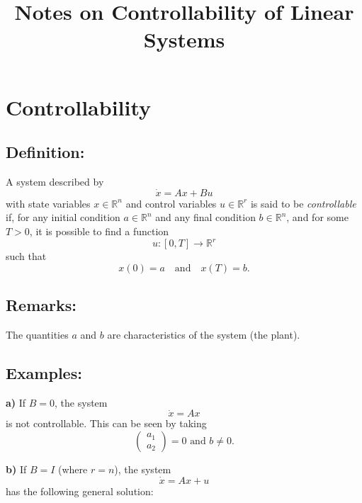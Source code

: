 \documentclass{article}
\title{Notes on Controllability of Linear Systems}
\author{}
\date{}
\begin{document}
\maketitle

\section*{Controllability}

\subsection*{Definition:}
A system described by
\[
\dot{x} = Ax + Bu
\]
with state variables $x \in \mathbb{R}^n$ and control variables $u \in \mathbb{R}^r$ is said to be \textit{controllable} if, for any initial condition $a \in \mathbb{R}^n$ and any final condition $b \in \mathbb{R}^n$, and for some $T > 0$, it is possible to find a function
\[
u: [0, T] \rightarrow \mathbb{R}^r
\]
such that
\[
x(0) = a \quad \text{and} \quad x(T) = b.
\]

\subsection*{Remarks:}
The quantities $a$ and $b$ are characteristics of the system (the plant).

\subsection*{Examples:}

\textbf{a)} If $B=0$, the system
\[
\dot{x} = Ax
\]
is not controllable. This can be seen by taking
\[
\begin{pmatrix}
a_1 \\
a_2
\end{pmatrix}
= 0
\text{ and }
b \neq 0.
\]

\textbf{b)} If $B=I$ (where $r=n$), the system
\[
\dot{x} = Ax + u
\]
has the following general solution:
\end{document}
